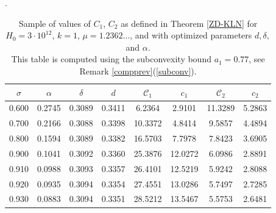 \documentclass[10pt]{amsart}
\theoremstyle{definition}
\numberwithin{equation}{section}
\begin{document}
\begin{table}[h!]
\centering
\caption{Sample of values of $C_1$, $C_2$ as defined in Theorem \ref{ZD-KLN} for $H_0 = 3 \cdot 10^{12}$, $k = 1$, $\mu = 1.2362...$, and with optimized parameters
$d, \delta,$ and $\alpha$.\\This table is computed using the subconvexity bound $a_1=0.77$, see Remark \ref{compprev}(\ref{subconv}).}\label{table:NSigmaOptTable}.
\begin{tabular}{|c|c|c|c|c|c|c|c|}
\hline
$\sigma$ & $\alpha$ & $\delta$ & $d$ & $\mathcal{C}_1$ & $c_1$ & $\mathcal{C}_2$ & $c_2$ \\
\hline
0.600 & 0.2745 & 0.3089 & 0.3411 & 6.2364 & 2.9101 & 11.3289 & 5.2863 \\
0.700 & 0.2166 & 0.3088 & 0.3398 & 10.3372 & 4.8414 & 9.5857 & 4.4894 \\
0.800 & 0.1594 & 0.3089 & 0.3382 & 16.5703 & 7.7978 & 7.8423 & 3.6905 \\
0.900 & 0.1041 & 0.3092 & 0.3360 & 25.3876 & 12.0272 & 6.0986 & 2.8891 \\
0.910 & 0.0988 & 0.3093 & 0.3357 & 26.4101 & 12.5219 & 5.9242 & 2.8088 \\
0.920 & 0.0935 & 0.3094 & 0.3354 & 27.4551 & 13.0286 & 5.7497 & 2.7285 \\
0.930 & 0.0883 & 0.3094 & 0.3351 & 28.5212 & 13.5467 & 5.5753 & 2.6481 \\

\end{tabular}
\end{table}
\end{document}
